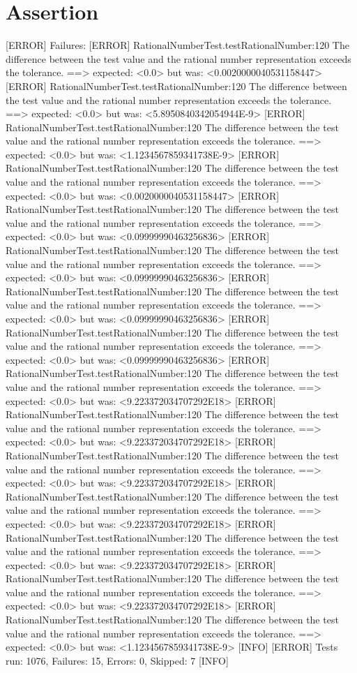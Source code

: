 \documentclass[a4paper,12pt]{report}
\begin{document}
\section{Assertion}
[ERROR] Failures: 
[ERROR]   RationalNumberTest.testRationalNumber:120 The difference between the test value and the rational number representation exceeds the tolerance. ==> expected: <0.0> but was: <0.0020000040531158447>
[ERROR]   RationalNumberTest.testRationalNumber:120 The difference between the test value and the rational number representation exceeds the tolerance. ==> expected: <0.0> but was: <5.8950840342054944E-9>
[ERROR]   RationalNumberTest.testRationalNumber:120 The difference between the test value and the rational number representation exceeds the tolerance. ==> expected: <0.0> but was: <1.1234567859341738E-9>
[ERROR]   RationalNumberTest.testRationalNumber:120 The difference between the test value and the rational number representation exceeds the tolerance. ==> expected: <0.0> but was: <0.0020000040531158447>
[ERROR]   RationalNumberTest.testRationalNumber:120 The difference between the test value and the rational number representation exceeds the tolerance. ==> expected: <0.0> but was: <0.09999990463256836>
[ERROR]   RationalNumberTest.testRationalNumber:120 The difference between the test value and the rational number representation exceeds the tolerance. ==> expected: <0.0> but was: <0.09999990463256836>
[ERROR]   RationalNumberTest.testRationalNumber:120 The difference between the test value and the rational number representation exceeds the tolerance. ==> expected: <0.0> but was: <0.09999990463256836>
[ERROR]   RationalNumberTest.testRationalNumber:120 The difference between the test value and the rational number representation exceeds the tolerance. ==> expected: <0.0> but was: <0.09999990463256836>
[ERROR]   RationalNumberTest.testRationalNumber:120 The difference between the test value and the rational number representation exceeds the tolerance. ==> expected: <0.0> but was: <9.223372034707292E18>
[ERROR]   RationalNumberTest.testRationalNumber:120 The difference between the test value and the rational number representation exceeds the tolerance. ==> expected: <0.0> but was: <9.223372034707292E18>
[ERROR]   RationalNumberTest.testRationalNumber:120 The difference between the test value and the rational number representation exceeds the tolerance. ==> expected: <0.0> but was: <9.223372034707292E18>
[ERROR]   RationalNumberTest.testRationalNumber:120 The difference between the test value and the rational number representation exceeds the tolerance. ==> expected: <0.0> but was: <9.223372034707292E18>
[ERROR]   RationalNumberTest.testRationalNumber:120 The difference between the test value and the rational number representation exceeds the tolerance. ==> expected: <0.0> but was: <9.223372034707292E18>
[ERROR]   RationalNumberTest.testRationalNumber:120 The difference between the test value and the rational number representation exceeds the tolerance. ==> expected: <0.0> but was: <9.223372034707292E18>
[ERROR]   RationalNumberTest.testRationalNumber:120 The difference between the test value and the rational number representation exceeds the tolerance. ==> expected: <0.0> but was: <1.1234567859341738E-9>
[INFO] 
[ERROR] Tests run: 1076, Failures: 15, Errors: 0, Skipped: 7
[INFO] 
\end{document}

